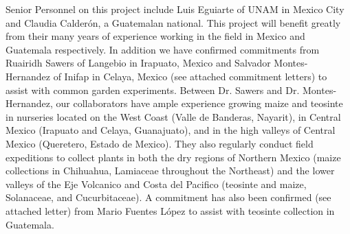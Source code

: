 Senior Personnel on this project include Luis Eguiarte of UNAM in Mexico City and Claudia Calder\'{o}n, a Guatemalan national.  This project will benefit greatly from their many years of experience working in the field in Mexico and Guatemala respectively.  In addition we have confirmed commitments from Ruairidh Sawers of Langebio in Irapuato, Mexico and Salvador Montes-Hernandez of Inifap in Celaya, Mexico (see attached commitment letters) to assist with common garden experiments.  Between Dr. Sawers and Dr. Montes-Hernandez, our collaborators have ample experience growing maize and teosinte in nurseries located on the West Coast (Valle de Banderas, Nayarit), in Central Mexico (Irapuato and Celaya, Guanajuato), and in the high valleys of Central Mexico (Queretero, Estado de Mexico). They also regularly conduct field expeditions to collect plants in both the dry regions of Northern Mexico (maize collections in Chihuahua, Lamiaceae throughout the Northeast) and the lower valleys of the Eje Volcanico and Costa del Pacifico (teosinte and maize, Solanaceae, and Cucurbitaceae).  A commitment has also been confirmed (see attached letter) from Mario Fuentes L\'{o}pez to assist with teosinte collection in Guatemala.
